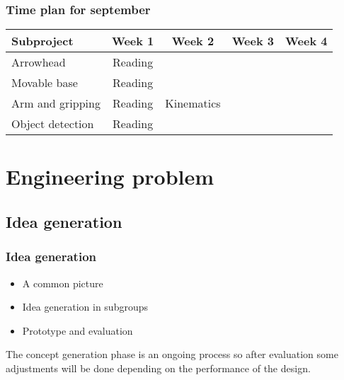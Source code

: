 \documentclass{beamer}
\begin{document}
\begin{frame}
    \frametitle{Time plan for september}
    \begin{table}
        \begin{tabular}{l | c | c | c | c }
        Subproject & Week 1 & Week 2 & Week 3 & Week 4 \\
        \hline \hline
            Arrowhead & Reading& & & \\
            Movable base & Reading& & & \\
            Arm and gripping  & Reading & Kinematics& & \\
            Object detection & Reading & & & \\
        \end{tabular}
    \end{table}
\end{frame}

\section{Engineering problem}
\begin{frame}
    \subsection{Idea generation}
    \frametitle{Idea generation} 
    \begin{itemize}
        \item A common picture
        \item Idea generation in subgroups
        \item Prototype and evaluation
    \end{itemize}
    The concept generation phase is an ongoing process so after evaluation
    some adjustments will be done depending on the performance
    of the design.
\end{frame}
\end{document}
